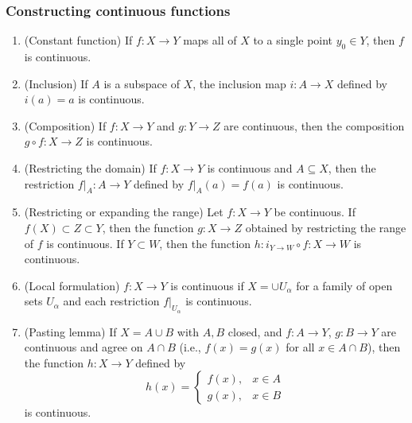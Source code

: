\subsubsection{Constructing continuous functions}
\begin{theorem}
  \begin{enumerate}
    \item (Constant function) If $f:X\to Y$ maps all of $X$ to a single point $y_0\in Y$, then $f$ is continuous.
    \item (Inclusion) If $A$ is a subspace of $X$, the inclusion map $i:A\to X$ defined by $i(a)=a$ is continuous.
    \item (Composition) If $f:X\to Y$ and $g:Y\to Z$ are continuous, then the composition $g\circ f:X\to Z$ is continuous.
    \item (Restricting the domain) If $f:X\to Y$ is continuous and $A\subseteq X$, then the restriction $f|_A:A\to Y$ defined by $f|_A(a)=f(a)$ is continuous.
    \item (Restricting or expanding the range) Let $f:X\to Y$ be continuous. If $f(X)\subset Z\subset Y$, then the function $g:X\to Z$  obtained by restricting the range of $f$ is continuous. If $Y\subset W$, then the function $h:i_{Y\to W}\circ f:X\to W$ is continuous.
    \item (Local formulation) $f:X\to Y$ is continuous if $X=\cup U_\alpha$ for a family of open sets $U_\alpha$ and each restriction $f|_{U_\alpha}$ is continuous.
    \item (Pasting lemma) If $X=A\cup B$ with $A,B$ closed, and $f:A\to Y$, $g:B\to Y$ are continuous and agree on $A\cap B$ (i.e., $f(x)=g(x)$ for all $x\in A\cap B$), then the function $h:X\to Y$ defined by
    \[h(x)=\begin{cases}
    f(x),&x\in A\\
    g(x),&x\in B
    \end{cases}\]
    is continuous.
  \end{enumerate}
\end{theorem}

